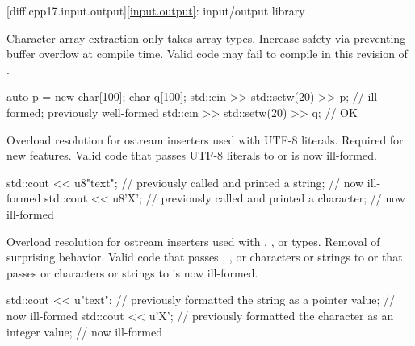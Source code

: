 [diff.cpp17.input.output]{\ref*{input.output}: input/output library}

\change
Character array extraction only takes array types.
\rationale
Increase safety via preventing buffer overflow at compile time.
\effect
Valid \CppXVII{} code may fail to compile in this revision of \Cpp{}.
\begin{example}
\begin{codeblock}
auto p = new char[100];
char q[100];
std::cin >> std::setw(20) >> p;         // ill-formed; previously well-formed
std::cin >> std::setw(20) >> q;         // OK
\end{codeblock}
\end{example}

%
\change
Overload resolution for ostream inserters used with UTF-8 literals.
\rationale
Required for new features.
\effect
Valid \CppXVII{} code that passes UTF-8 literals to
 or
 is now ill-formed.
\begin{example}
\begin{codeblock}
std::cout << u8"text";          // previously called  and printed a string;
                                // now ill-formed
std::cout << u8'X';             // previously called  and printed a character;
                                // now ill-formed
\end{codeblock}
\end{example}

\change
Overload resolution for ostream inserters
used with , , or  types.
\rationale
Removal of surprising behavior.
\effect
Valid \CppXVII{} code that passes
, , or  characters or strings
to  or
that passes  or  characters or strings
to  is now ill-formed.
\begin{example}
\begin{codeblock}
std::cout << u"text";           // previously formatted the string as a pointer value;
                                // now ill-formed
std::cout << u'X';              // previously formatted the character as an integer value;
                                // now ill-formed
\end{codeblock}
\end{example}

